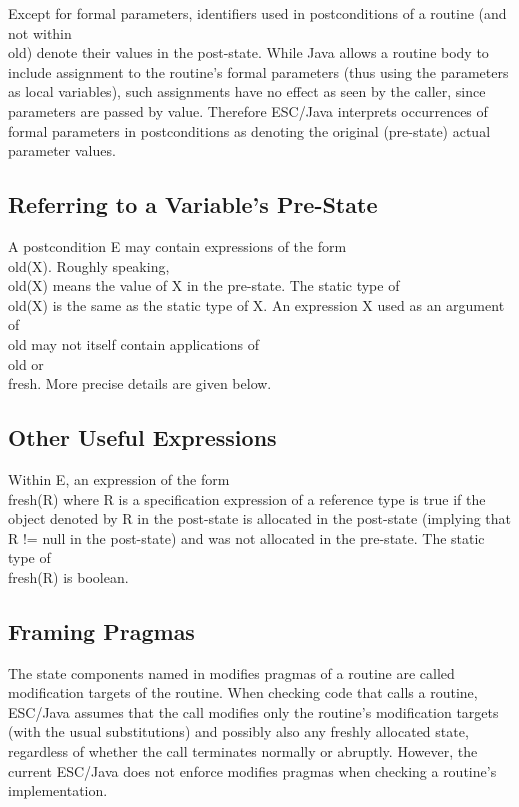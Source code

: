 \documentclass{acm_proc_article-sp}[10pt]
\begin{document}
Except for formal parameters, identifiers used in postconditions of a
routine (and not within \\old) denote their values in the post-state.
While Java allows a routine body to include assignment to the
routine's formal parameters (thus using the parameters as local
variables), such assignments have no effect as seen by the caller,
since parameters are passed by value.  Therefore ESC/Java interprets
occurrences of formal parameters in postconditions as denoting the
original (pre-state) actual parameter values.

\subsection{Referring to a Variable's Pre-State}

A postcondition E may contain expressions of the form \\old(X).
Roughly speaking, \\old(X) means the value of X in the pre-state.  The
static type of \\old(X) is the same as the static type of X.  An
expression X used as an argument of \\old may not itself contain
applications of \\old or \\fresh.  More precise details are given below.

\subsection{Other Useful Expressions}

Within E, an expression of the form \\fresh(R) where R is a
specification expression of a reference type is true if the object
denoted by R in the post-state is allocated in the post-state
(implying that R != null in the post-state) and was not allocated in
the pre-state.  The static type of \\fresh(R) is boolean.

\subsection{Framing Pragmas}

The state components named in modifies pragmas of a routine are called
modification targets of the routine.  When checking code that calls a
routine, ESC/Java assumes that the call modifies only the routine's
modification targets (with the usual substitutions) and possibly also
any freshly allocated state, regardless of whether the call terminates
normally or abruptly. However, the current ESC/Java does not enforce
modifies pragmas when checking a routine's implementation.
\end{document}
